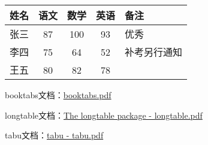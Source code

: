 \documentclass{ctexart}
\begin{document}

    \begin{tabular}{|l||c|c|c|p{1.5cm}|}
        \hline
        姓名 & 语文 & 数学 & 英语 & 备注 \\
        \hline \hline
        张三 & 87 & 100 & 93 & 优秀 \\
        \hline
        李四 & 75 & 64 & 52 & 补考另行通知 \\
        \hline
        王五 & 80 & 82 & 78 & \\
        \hline
    \end{tabular}

    booktabs文档：\href{https://texdoc.net/texmf-dist/doc/latex/booktabs/booktabs.pdf}{booktabs.pdf}
    
    longtable文档：\href{https://texdoc.net/texmf-dist/doc/latex/tools/longtable.pdf}{The longtable package - longtable.pdf}

    tabu文档：\href{https://texdoc.net/texmf-dist/doc/latex/tabu/tabu.pdf}{tabu - tabu.pdf}
\end{document}
